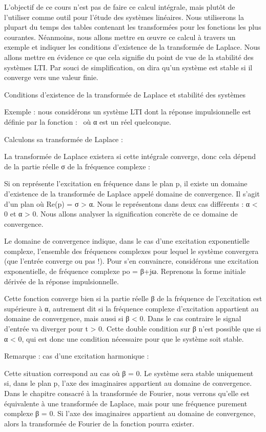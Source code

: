 \documentclass[]{article}
\begin{document}
L'objectif de ce cours n'est pas de faire ce calcul intégrale, mais
plutôt de l'utiliser comme outil pour l'étude des systèmes linéaires.
Nous utiliserons la plupart du temps des tables contenant les
transformées pour les fonctions les plus courantes. Néanmoins, nous
allons mettre en œuvre ce calcul à travers un exemple et indiquer les
conditions d'existence de la transformée de Laplace. Nous allons mettre
en évidence ce que cela signifie du point de vue de la stabilité des
systèmes LTI. Par souci de simplification, on dira qu'un système est
stable si il converge vers une valeur finie.

Conditions d'existence de la transformée de Laplace et stabilité des
systèmes

Exemple : nous considérons un système LTI dont la réponse impulsionnelle
est définie par la fonction :~ où α est un réel quelconque.

Calculons sa transformée de Laplace :

La transformée de Laplace existera si cette intégrale converge, donc
cela dépend de la partie réelle σ de la fréquence complexe :

Si on représente l'excitation en fréquence dans le plan p, il existe un
domaine d'existence de la transformée de Laplace appelé domaine de
convergence. Il s'agit d'un plan où Re(p) = σ \textgreater{} α. Nous le
représentons dans deux cas différents : α \textless{} 0 et α
\textgreater{} 0. Nous allons analyser la signification concrète de ce
domaine de convergence.

Le domaine de convergence indique, dans le cas d'une excitation
exponentielle complexe, l'ensemble des fréquences complexes pour lequel
le système convergera (que l'entrée converge ou pas !). Pour s'en
convaincre, considérons une excitation exponentielle, de fréquence
complexe po = β+jω. Reprenons la forme initiale dérivée de la réponse
impulsionnelle.

Cette fonction converge bien si la partie réelle β de la fréquence de
l'excitation est supérieure à α, autrement dit si la fréquence complexe
d'excitation appartient au domaine de convergence, mais aussi si β
\textless{} 0. Dans le cas contraire le signal d'entrée va diverger pour
t \textgreater{} 0. Cette double condition sur β n'est possible que si α
\textless{} 0, qui est donc une condition nécessaire pour que le système
soit stable.

Remarque : cas d'une excitation harmonique :

Cette situation correspond au cas où β = 0. Le système sera stable
uniquement si, dans le plan p, l'axe des imaginaires appartient au
domaine de convergence. Dans le chapitre consacré à la transformée de
Fourier, nous verrons qu'elle est équivalente à une transformée de
Laplace, mais pour une fréquence purement complexe β = 0. Si l'axe des
imaginaires appartient au domaine de convergence, alors la transformée
de Fourier de la fonction pourra exister.
\end{document}
